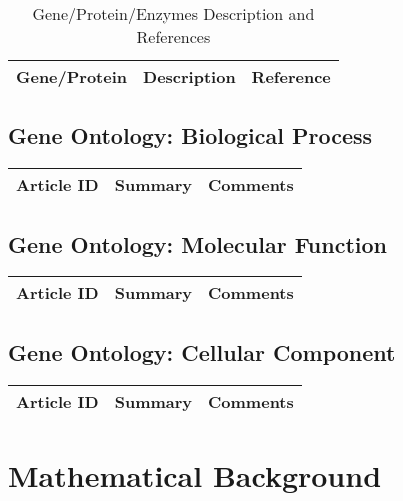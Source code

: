 \centering	
\begin{table}[H]\tiny
\caption{Gene/Protein/Enzymes Description and References}	
\begin{tabular}{r|p{3cm}|l}
\hline	
Gene/Protein & Description & Reference \\
\hline 
\hline 
\end{tabular}
\end{table}


\subsection{Gene Ontology: Biological Process}

\begin{table}[H]\centering
	\begin{tabular}{p{1cm}p{4cm}p{3cm}}
		Article ID & Summary & Comments\\
		\hline
		\hline
	\end{tabular}
\end{table}

\subsection{Gene Ontology: Molecular Function}

\begin{table}[H]\centering
	\begin{tabular}{p{1cm}p{4cm}p{3cm}}
		Article ID & Summary & Comments\\
		\hline
		\hline
	\end{tabular}
\end{table}

\subsection{Gene Ontology: Cellular Component}

\begin{table}[H]\centering
	\begin{tabular}{p{1cm}p{4cm}p{3cm}}
		Article ID & Summary & Comments\\
		\hline
		\hline
	\end{tabular}
\end{table}

\section{Mathematical Background}

\begin{enumerate}
\end{enumerate}

